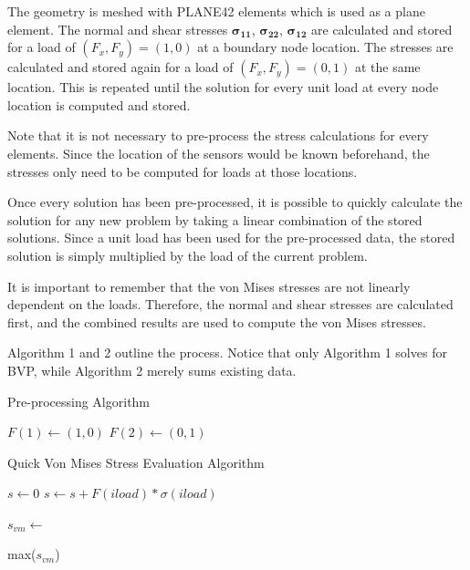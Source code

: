 \documentclass[letterpaper,12pt,]{article}
\begin{document}
The geometry is meshed with PLANE42 elements which is used as a plane element. The normal and shear stresses $\boldsymbol{\sigma_{11}}$, $\boldsymbol{\sigma_{22}}$, $\boldsymbol{\sigma_{12}}$ are calculated and stored for a load of $(F_x,F_y) = (1, 0)$ at a boundary node location. The stresses are calculated and stored again for a load of $(F_x,F_y) = (0, 1)$ at the same location. This is repeated until the solution for every unit load at every node location is computed and stored.

Note that it is not necessary to pre-process the stress calculations for every elements. Since the location of the sensors would be known beforehand, the stresses only need to be computed for loads at those locations.

Once every solution has been pre-processed, it is possible to quickly calculate the solution for any new problem by taking a linear combination of the stored solutions. Since a unit load has been used for the pre-processed data, the stored solution is simply multiplied by the load of the current problem. 

It is important to remember that the von Mises stresses are not linearly dependent on the loads. Therefore, the normal and shear stresses are calculated first, and the combined results are used to compute the von Mises stresses.

Algorithm 1 and 2 outline the process. Notice that only Algorithm 1 solves for BVP, while Algorithm 2 merely sums existing data.

\begin{algorithm}
\caption{Pre-processing Algorithm}\label{pproc}
\begin{algorithmic}[1]
\State {}
\State $F(1) \gets (1,0)$
\State $F(2) \gets (0,1)$
 
  \State {}
  \State {} 
  \State {}
\EndFor
\EndFor
\end{algorithmic}
\end{algorithm}


\begin{algorithm}
\caption{Quick Von Mises Stress Evaluation Algorithm}\label{VMalg}
\begin{algorithmic}[1]
\State {}
\State {}

\State $s\gets 0$
  \State $s \gets s + F(iload) * \sigma(iload)$ 
\EndFor

\State $s_{vm} \gets $ 

\State \Return max($s_{vm}$)

\end{algorithmic}
\end{algorithm}
\end{document}
